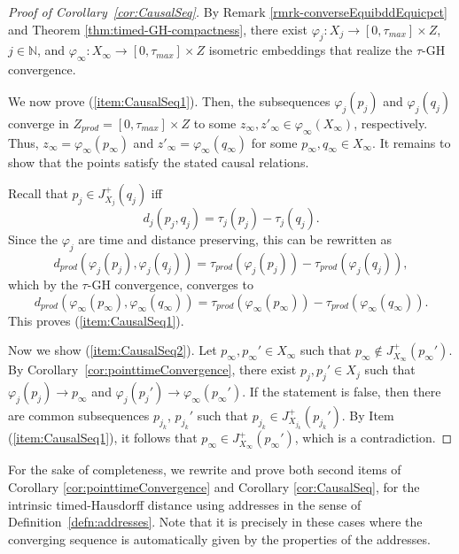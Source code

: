 \documentclass[a4paper,12pt,reqno]{amsart}
\theoremstyle{plain}
\newcommand{\be}{\begin{equation}}
\newcommand{\ee}{\end{equation}}
\begin{document}
\begin{proof}[Proof of Corollary~\ref{cor:CausalSeq}]
By Remark \ref{rmrk-converseEquibddEquicpct} and Theorem \ref{thm:timed-GH-compactness}, there exist
  $\varphi_j: X_j \to [0,\tau_{max}]\times Z$, $j \in \mathbb N$, and $\varphi_\infty: X_\infty \to [0,\tau_{max}]\times Z$ isometric embeddings that realize the $\tau$-GH convergence. 
 
 
We now prove (\ref{item:CausalSeq1}).
Then, the subsequences $\varphi_j(p_j)$ and $\varphi_j(q_j)$ converge in $Z_{prod}=[0,\tau_{max}]\times Z$ to some $z_\infty, z'_\infty \in \varphi_\infty(X_\infty)$, respectively. 
Thus, $z_\infty=\varphi_\infty(p_\infty)$ and 
 $z'_\infty=\varphi_\infty(q_\infty)$ for some 
 $p_\infty, q_\infty \in X_\infty$. It remains to show that the points satisfy the stated causal relations.

Recall that $p_j\in J^+_{X_j}(q_j)$ iff 
\be
d_j(p_j, q_j)= \tau_j(p_j) - \tau_j(q_j).
\ee
Since the $\varphi_j$ are time and distance preserving, this can be rewritten as 
\be
d_{prod}(\varphi_j(p_j),\varphi_j(q_j))= \tau_{prod}(\varphi_j(p_j)) - \tau_{prod}(\varphi_j(q_j)),
\ee
which by the $\tau$-GH convergence,
converges to 
\be
d_{prod}(\varphi_\infty(p_\infty),\varphi_\infty(q_\infty))= \tau_{prod}(\varphi_\infty(p_\infty)) - \tau_{prod}(\varphi_\infty(q_\infty)).
\ee
This proves (\ref{item:CausalSeq1}). 


Now we show (\ref{item:CausalSeq2}). Let $p_\infty,p_\infty'\in X_\infty$ such that $p_\infty \not\in J^+_{X_\infty}(p_\infty')$. By Corollary~\ref{cor:pointtimeConvergence}, there exist $p_j,p_j'\in X_j$ such that $\varphi_j(p_j)\to p_\infty$ and $\varphi_j(p_j')\to \varphi_\infty(p_\infty')$. If the statement is false, then there are common subsequences $p_{j_k}$, $p_{j_k}'$ such that $p_{j_k}\in J^+_{X_{j_k}}(p_{j_k}')$. By Item (\ref{item:CausalSeq1}), it follows that $p_\infty \in J^+_{X_\infty}(p_\infty')$, which is a contradiction.
\end{proof}



For the sake of completeness, we rewrite and prove both second items of Corollary \ref{cor:pointtimeConvergence} and Corollary \ref{cor:CausalSeq}, for the intrinsic timed-Hausdorff distance using addresses in the sense of Definition~\ref{defn:addresses}. Note that it is precisely in these cases where the converging sequence is automatically given by the properties of the addresses. 
\end{document}
